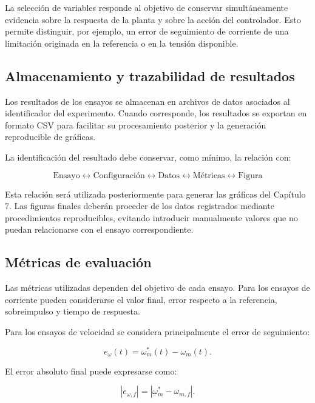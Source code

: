 La selección de variables responde al objetivo de conservar simultáneamente evidencia sobre la respuesta de la planta y sobre la acción del controlador. Esto permite distinguir, por ejemplo, un error de seguimiento de corriente de una limitación originada en la referencia o en la tensión disponible.

\subsection{Almacenamiento y trazabilidad de resultados}

Los resultados de los ensayos se almacenan en archivos de datos asociados al identificador del experimento. Cuando corresponde, los resultados se exportan en formato CSV para facilitar su procesamiento posterior y la generación reproducible de gráficas.

La identificación del resultado debe conservar, como mínimo, la relación con:

\begin{equation}
\text{Ensayo}
\leftrightarrow
\text{Configuración}
\leftrightarrow
\text{Datos}
\leftrightarrow
\text{Métricas}
\leftrightarrow
\text{Figura}
\end{equation}

Esta relación será utilizada posteriormente para generar las gráficas del Capítulo 7. Las figuras finales deberán proceder de los datos registrados mediante procedimientos reproducibles, evitando introducir manualmente valores que no puedan relacionarse con el ensayo correspondiente.

\subsection{Métricas de evaluación}

Las métricas utilizadas dependen del objetivo de cada ensayo. Para los ensayos de corriente pueden considerarse el valor final, error respecto a la referencia, sobreimpulso y tiempo de respuesta.

Para los ensayos de velocidad se considera principalmente el error de seguimiento:

\begin{equation}
e_{\omega}(t)
=
\omega_m^*(t)-\omega_m(t).
\end{equation}

El error absoluto final puede expresarse como:

\begin{equation}
|e_{\omega,f}|
=
\left|
\omega_m^*-\omega_{m,f}
\right|.
\end{equation}

